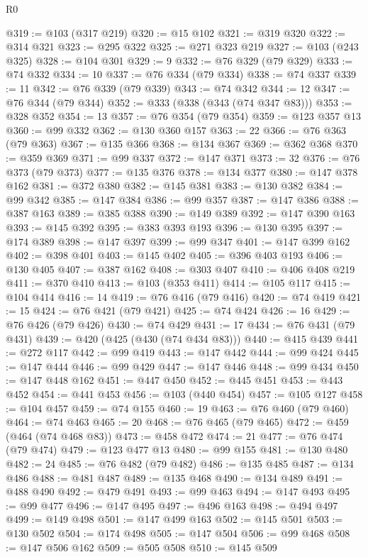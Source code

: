 \begin{lexlean}{R0}
\begin{coremodule}
@319 := @103 (@317 @219)
@320 := @15 @102
@321 := @319 @320
@322 := @314 @321
@323 := @295 @322
@325 := @271 @323 @219
@327 := @103 (@243 @325)
@328 := @104 @301
@329 := 9
@332 := @76 @329 (@79 @329)
@333 := @74 @332
@334 := 10
@337 := @76 @334 (@79 @334)
@338 := @74 @337
@339 := 11
@342 := @76 @339 (@79 @339)
@343 := @74 @342
@344 := 12
@347 := @76 @344 (@79 @344)
@352 := @333 (@338 (@343 (@74 @347 @83)))
@353 := @328 @352
@354 := 13
@357 := @76 @354 (@79 @354)
@359 := @123 @357 @13
@360 := @99 @332
@362 := @130 @360 @157
@363 := 22
@366 := @76 @363 (@79 @363)
@367 := @135 @366
@368 := @134 @367
@369 := @362 @368
@370 := @359 @369
@371 := @99 @337
@372 := @147 @371
@373 := 32
@376 := @76 @373 (@79 @373)
@377 := @135 @376
@378 := @134 @377
@380 := @147 @378 @162
@381 := @372 @380
@382 := @145 @381
@383 := @130 @382
@384 := @99 @342
@385 := @147 @384
@386 := @99 @357
@387 := @147 @386
@388 := @387 @163
@389 := @385 @388
@390 := @149 @389
@392 := @147 @390 @163
@393 := @145 @392
@395 := @383 @393 @193
@396 := @130 @395
@397 := @174 @389
@398 := @147 @397
@399 := @99 @347
@401 := @147 @399 @162
@402 := @398 @401
@403 := @145 @402
@405 := @396 @403 @193
@406 := @130 @405
@407 := @387 @162
@408 := @303 @407
@410 := @406 @408 @219
@411 := @370 @410
@413 := @103 (@353 @411)
@414 := @105 @117
@415 := @104 @414
@416 := 14
@419 := @76 @416 (@79 @416)
@420 := @74 @419
@421 := 15
@424 := @76 @421 (@79 @421)
@425 := @74 @424
@426 := 16
@429 := @76 @426 (@79 @426)
@430 := @74 @429
@431 := 17
@434 := @76 @431 (@79 @431)
@439 := @420 (@425 (@430 (@74 @434 @83)))
@440 := @415 @439
@441 := @272 @117
@442 := @99 @419
@443 := @147 @442
@444 := @99 @424
@445 := @147 @444
@446 := @99 @429
@447 := @147 @446
@448 := @99 @434
@450 := @147 @448 @162
@451 := @447 @450
@452 := @445 @451
@453 := @443 @452
@454 := @441 @453
@456 := @103 (@440 @454)
@457 := @105 @127
@458 := @104 @457
@459 := @74 @155
@460 := 19
@463 := @76 @460 (@79 @460)
@464 := @74 @463
@465 := 20
@468 := @76 @465 (@79 @465)
@472 := @459 (@464 (@74 @468 @83))
@473 := @458 @472
@474 := 21
@477 := @76 @474 (@79 @474)
@479 := @123 @477 @13
@480 := @99 @155
@481 := @130 @480
@482 := 24
@485 := @76 @482 (@79 @482)
@486 := @135 @485
@487 := @134 @486
@488 := @481 @487
@489 := @135 @468
@490 := @134 @489
@491 := @488 @490
@492 := @479 @491
@493 := @99 @463
@494 := @147 @493
@495 := @99 @477
@496 := @147 @495
@497 := @496 @163
@498 := @494 @497
@499 := @149 @498
@501 := @147 @499 @163
@502 := @145 @501
@503 := @130 @502
@504 := @174 @498
@505 := @147 @504
@506 := @99 @468
@508 := @147 @506 @162
@509 := @505 @508
@510 := @145 @509

\end{coremodule}
\end{lexlean}
